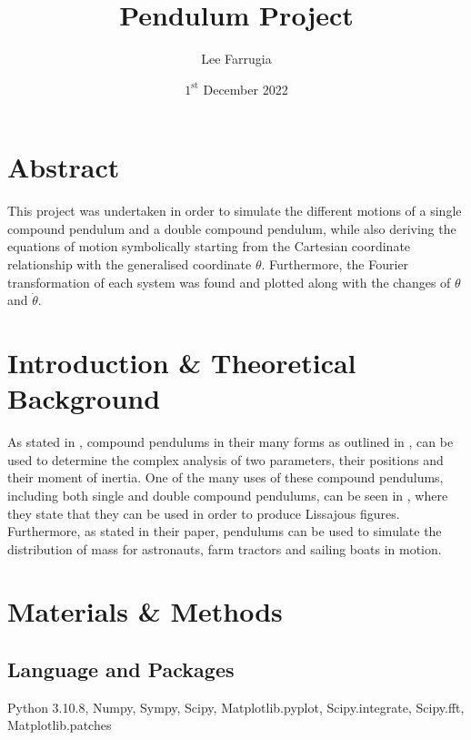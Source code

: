 \documentclass[12pt, a4paper]{article}
\title{Pendulum Project}
\date{\(1^\mathrm{{st}}\) December 2022}
\author{Lee Farrugia}
\begin{document}
    
\maketitle
\thispagestyle{titlepagestyle}
\pagestyle{mystyle}

\section{Abstract}
This project was undertaken in order to simulate the different motions of a single compound pendulum and a double compound pendulum, while also deriving the equations of motion symbolically starting from the Cartesian coordinate relationship with the generalised coordinate \(\theta\). Furthermore, the Fourier transformation of each system was found and plotted along with the changes of \(\theta\) and \(\dot{\theta}\).

\section{Introduction \& Theoretical Background}
As stated in \cite{hinrichsen1981practical}, compound pendulums in their many forms as outlined in \cite{harmographics1}, can be used to determine the complex analysis of two parameters, their positions and their moment of inertia. One of the many uses of these compound pendulums, including both single and double compound pendulums, can be seen in \cite{art}, where they state that they can be used in order to produce Lissajous figures. Furthermore, as \cite{hinrichsen1981practical} stated in their paper, pendulums can be used to simulate the distribution of mass for astronauts, farm tractors and sailing boats in motion.

\section{Materials \& Methods}
\subsection{Language and Packages}
Python 3.10.8, Numpy, Sympy, Scipy, Matplotlib.pyplot, Scipy.integrate, Scipy.fft, Matplotlib.patches
\end{document}
